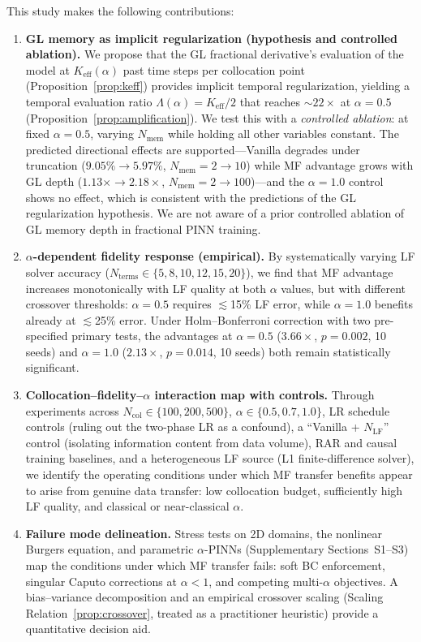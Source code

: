 \documentclass[11pt]{article}
\newcommand{\Ncol}{N_{\mathrm{col}}}
\newcommand{\NLF}{N_{\mathrm{LF}}}
\begin{document}
This study makes the following contributions:
\begin{enumerate}
    \item \textbf{GL memory as implicit regularization (hypothesis and controlled ablation).} We propose that the GL fractional derivative's evaluation of the model at $K_{\mathrm{eff}}(\alpha)$ past time steps per collocation point (Proposition~\ref{prop:keff}) provides implicit temporal regularization, yielding a temporal evaluation ratio $\Lambda(\alpha) = K_{\mathrm{eff}}/2$ that reaches ${\sim}22\times$ at $\alpha = 0.5$ (Proposition~\ref{prop:amplification}). We test this with a \emph{controlled ablation}: at fixed $\alpha = 0.5$, varying $N_{\mathrm{mem}}$ while holding all other variables constant. The predicted directional effects are supported---Vanilla degrades under truncation ($9.05\% \to 5.97\%$, $N_{\mathrm{mem}} = 2 \to 10$) while MF advantage grows with GL depth ($1.13\times \to 2.18\times$, $N_{\mathrm{mem}} = 2 \to 100$)---and the $\alpha = 1.0$ control shows no effect, which is consistent with the predictions of the GL regularization hypothesis. We are not aware of a prior controlled ablation of GL memory depth in fractional PINN training.

    \item \textbf{$\alpha$-dependent fidelity response (empirical).} By systematically varying LF solver accuracy ($N_{\mathrm{terms}} \in \{5, 8, 10, 12, 15, 20\}$), we find that MF advantage increases monotonically with LF quality at both $\alpha$ values, but with different crossover thresholds: $\alpha = 0.5$ requires $\lesssim$15\% LF error, while $\alpha = 1.0$ benefits already at $\lesssim$25\% error. Under Holm--Bonferroni correction with two pre-specified primary tests, the advantages at $\alpha = 0.5$ ($3.66\times$, $p = 0.002$, 10 seeds) and $\alpha = 1.0$ ($2.13\times$, $p = 0.014$, 10 seeds) both remain statistically significant.

    \item \textbf{Collocation--fidelity--$\alpha$ interaction map with controls.} Through experiments across $\Ncol \in \{100, 200, 500\}$, $\alpha \in \{0.5, 0.7, 1.0\}$, LR schedule controls (ruling out the two-phase LR as a confound), a ``Vanilla + $\NLF$'' control (isolating information content from data volume), RAR and causal training baselines, and a heterogeneous LF source (L1 finite-difference solver), we identify the operating conditions under which MF transfer benefits appear to arise from genuine data transfer: low collocation budget, sufficiently high LF quality, and classical or near-classical $\alpha$.

    \item \textbf{Failure mode delineation.} Stress tests on 2D domains, the nonlinear Burgers equation, and parametric $\alpha$-PINNs (Supplementary Sections~S1--S3) map the conditions under which MF transfer fails: soft BC enforcement, singular Caputo corrections at $\alpha < 1$, and competing multi-$\alpha$ objectives. A bias--variance decomposition and an empirical crossover scaling (Scaling Relation~\ref{prop:crossover}, treated as a practitioner heuristic) provide a quantitative decision aid.
\end{enumerate}
\end{document}
